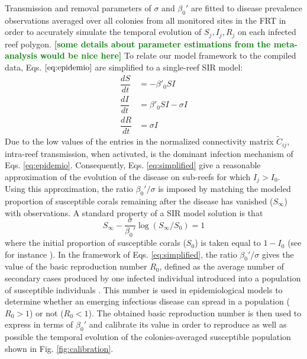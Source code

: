 \documentclass[utf8]{frontiersSCNS}
\newcommand{\erinn}[1]{\textbf{\textcolor{green}{#1}}}
\begin{document}
Transmission and removal parameters of $\sigma$ and $\beta_0'$ are fitted to disease prevalence observations averaged over all colonies from all monitored sites in the FRT in order to accurately simulate the temporal evolution of $S_j,I_j,R_j$ on each infected reef polygon. \erinn{[some details about parameter estimations from the meta-analysis would be nice here]}
To relate our model framework to the compiled data, Eqs. $\ref{eq:epidemio}$ are simplified to a single-reef SIR model:
\begin{equation}
    \begin{aligned}
        \dfrac{dS}{dt} &= -\beta'_0SI \\
        \dfrac{dI}{dt} &= \beta'_0SI - \sigma I \\
        \dfrac{dR}{dt} &= \sigma I
    \end{aligned}\label{eq:simplified}
\end{equation}
Due to the low values of the entries in the normalized connectivity matrix $\tilde{C}_{ij}$, intra-reef transmission, when activated, is the dominant infection mechanism of Eqs. \ref{eq:epidemio}. Consequently, Eqs. \ref{eq:simplified} give a reasonable approximation of the evolution of the disease on sub-reefs for which $I_j > I_0$. Using this approximation, the ratio $\beta_0'/\sigma$ is imposed by matching the modeled proportion of susceptible corals remaining after the disease has vanished ($S_\infty$) with observations. A standard property of a SIR model solution is that
\begin{equation}
    S_\infty - \frac{\sigma}{\beta_0'}\log(S_{\infty}/S_0) = 1\label{eq:ratio}
\end{equation}
where the initial proportion of susceptible corals ($S_0$) is taken equal to $1-I_0$ (see for instance \cite{Murray07}). In the framework of Eqs. \ref{eq:simplified}, the ratio $\beta_0'/\sigma$ gives the value of the basic reproduction number $R_0$, defined as the average number of secondary cases produced by one infected individual introduced into a population of susceptible individuals \citep{keeling2007stochastic}. This number is used in epidemiological models to determine whether an emerging infectious disease can spread in a population ($R_0 > 1$) or not ($R_0 < 1$). The obtained basic reproduction number is then used to express \sigma in terms of $\beta_0'$ and calibrate its value in order to reproduce as well as possible the temporal evolution of the colonies-averaged susceptible population shown in Fig. \ref{fig:calibration}.
\end{document}
